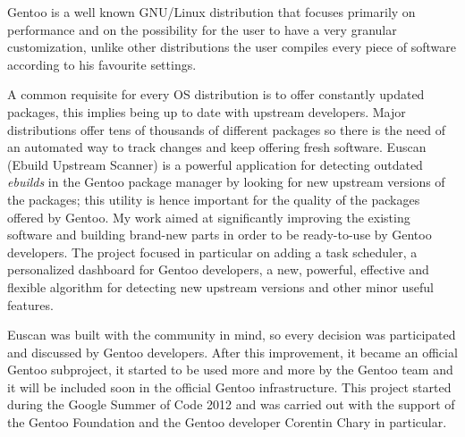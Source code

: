 
Gentoo is a well known GNU/Linux distribution that focuses primarily on performance and on the possibility for the user to have a very granular customization, unlike other distributions the user compiles every piece of software according to his favourite settings.

A common requisite for every OS distribution is to offer constantly updated packages, this implies being up to date with upstream developers. Major distributions offer tens of thousands of different packages so there is the need of an automated way to track changes and keep offering fresh software.
Euscan (Ebuild Upstream Scanner) is a powerful application for detecting outdated \emph{ebuilds} in the Gentoo package manager by looking for new upstream versions of the packages; this utility is hence important for the quality of the packages offered by Gentoo.
My work aimed at significantly improving the existing software and building brand-new parts in order to be ready-to-use by Gentoo developers. The project focused in particular on adding a task scheduler, a personalized dashboard for Gentoo developers, a new, powerful, effective and flexible algorithm for detecting new upstream versions and other minor useful features.

Euscan was built with the community in mind, so every decision was participated and discussed by Gentoo developers. After this improvement, it became an official Gentoo subproject, it started to be used more and more by the Gentoo team and it will be included soon in the official Gentoo infrastructure.
This project started during the Google Summer of Code 2012 and was carried out with the support of the Gentoo Foundation and the Gentoo developer Corentin Chary in particular.
